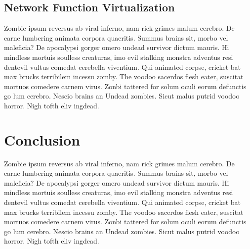 \subsection{Network Function Virtualization}
Zombie ipsum reversus ab viral inferno, nam rick grimes malum cerebro.
De carne lumbering animata corpora quaeritis.
Summus brains sit, morbo vel maleficia?
De apocalypsi gorger omero undead survivor dictum mauris. Hi mindless mortuis soulless creaturas, imo evil stalking monstra adventus resi dentevil vultus comedat cerebella viventium.
Qui animated corpse, cricket bat max brucks terribilem incessu zomby.
The voodoo sacerdos flesh eater, suscitat mortuos comedere carnem virus.
Zonbi tattered for solum oculi eorum defunctis go lum cerebro.
Nescio brains an Undead zombies.
Sicut malus putrid voodoo horror.
Nigh tofth eliv ingdead.

\section{Conclusion}
Zombie ipsum reversus ab viral inferno, nam rick grimes malum cerebro.
De carne lumbering animata corpora quaeritis.
Summus brains sit, morbo vel maleficia?
De apocalypsi gorger omero undead survivor dictum mauris. Hi mindless mortuis soulless creaturas, imo evil stalking monstra adventus resi dentevil vultus comedat cerebella viventium.
Qui animated corpse, cricket bat max brucks terribilem incessu zomby.
The voodoo sacerdos flesh eater, suscitat mortuos comedere carnem virus.
Zonbi tattered for solum oculi eorum defunctis go lum cerebro.
Nescio brains an Undead zombies.
Sicut malus putrid voodoo horror.
Nigh tofth eliv ingdead.
